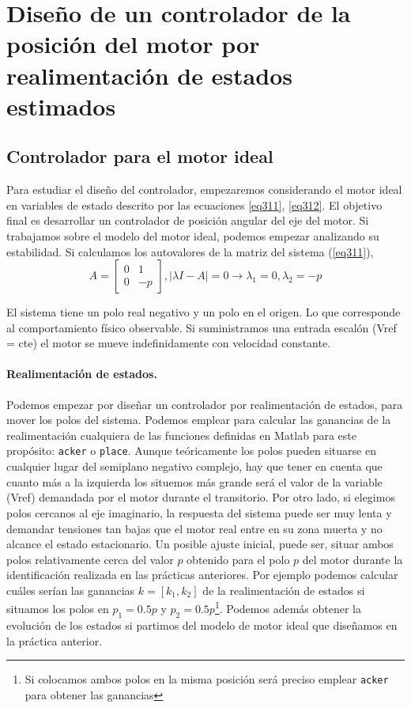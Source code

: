\documentclass[10pt,a4paper]{report}
\begin{document}
\section{Diseño de un controlador de la posición del motor por realimentación de estados estimados}
\subsection{Controlador para el motor ideal}
Para estudiar el diseño del controlador, empezaremos considerando el motor ideal en variables de estado descrito por las ecuaciones \ref{eq311}, \ref{eq312}. El objetivo final es desarrollar un controlador de posición angular del eje del motor. Si trabajamos sobre el modelo del motor ideal, podemos empezar analizando su estabilidad. Si calculamos los autovalores de la matriz del sistema (\ref{eq311}),
\begin{equation}
A = \begin{bmatrix}
0 & 1\\
0 &-p
\end{bmatrix}, \vert \lambda I-A\vert = 0 \rightarrow \lambda_1 = 0, \lambda_2=-p
\end{equation}

El sistema tiene un polo real negativo y un polo en el origen. Lo que corresponde al comportamiento físico observable. Si suministramos una entrada escalón (Vref = cte) el motor se mueve indefinidamente con velocidad constante. 

\paragraph{Realimentación de estados.} Podemos empezar por diseñar un controlador por realimentación de estados, para mover los polos del sistema.  Podemos emplear para calcular las ganancias de la realimentación cualquiera de las funciones definidas en Matlab para este propósito: \texttt{acker} o \texttt{place}. Aunque teóricamente los polos pueden situarse en cualquier lugar del semiplano negativo complejo, hay que tener en cuenta que cuanto más a la izquierda los situemos más grande será el valor de la variable (Vref) demandada por el motor durante el transitorio. Por otro lado, si elegimos polos cercanos al eje imaginario, la respuesta del sistema puede ser muy lenta  y demandar tensiones tan bajas que el motor real entre en su zona muerta y no alcance el estado estacionario. Un posible ajuste inicial, puede ser, situar ambos polos relativamente cerca del valor $p$ obtenido para el polo $p$ del motor durante la identificación realizada en las prácticas anteriores. Por ejemplo podemos calcular cuáles serían las ganancias $k = [k_1, k_2]$ de la realimentación de estados si situamos los polos en $p_1 = 0.5p$ y $p_2 = 0.5p$\footnote{Si colocamos ambos polos en la misma posición será preciso emplear \texttt{acker} para obtener las ganancias}. Podemos además obtener la evolución de los estados si partimos del modelo de motor ideal que diseñamos en la práctica anterior.  
\end{document}
